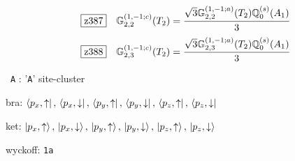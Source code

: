 \documentclass[fleqn,10pt,landscape]{jsarticle}
\begin{document}
\begin{dmath*}
\hspace*{3mm}\fbox{z387}\quad \mathbb{G}_{2,2}^{(1,-1;c)}(T_{2})=\frac{\sqrt{3} \mathbb{G}_{2,2}^{(1,-1;a)}(T_{2}) \mathbb{Q}_{0}^{(s)}(A_{1})}{3}
\end{dmath*}
\begin{dmath*}
\hspace*{3mm}\fbox{z388}\quad \mathbb{G}_{2,3}^{(1,-1;c)}(T_{2})=\frac{\sqrt{3} \mathbb{G}_{2,3}^{(1,-1;a)}(T_{2}) \mathbb{Q}_{0}^{(s)}(A_{1})}{3}
\end{dmath*}
\vspace{5mm}

\noindent\textbullet\, \texttt{A} : '\texttt{A}' site-cluster

\noindent\quad * bra: $\bra{p_{x},\uparrow},\, \bra{p_{x},\downarrow},\, \bra{p_{y},\uparrow},\, \bra{p_{y},\downarrow},\, \bra{p_{z},\uparrow},\, \bra{p_{z},\downarrow}$

\noindent\quad * ket: $\ket{p_{x},\uparrow},\, \ket{p_{x},\downarrow},\, \ket{p_{y},\uparrow},\, \ket{p_{y},\downarrow},\, \ket{p_{z},\uparrow},\, \ket{p_{z},\downarrow}$

\noindent\quad * wyckoff: \texttt{1a}
\end{document}
